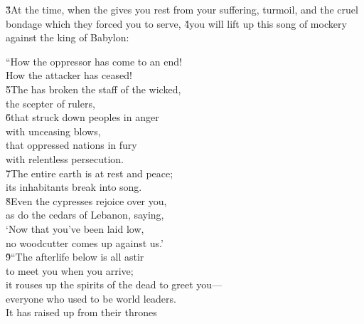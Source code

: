 \v{3}At the time, when the  gives you rest from your suffering, turmoil, and the cruel bondage which they forced you to serve, \v{4}you will lift up this song of mockery against the king of Babylon:

\begin{poetry}
\poeml ``How the oppressor has come to an end! \\
\poemll    How the attacker has ceased! \\
\poeml \v{5}The  has broken the staff of the wicked, \\
\poemll    the scepter of rulers, \\
\poeml \v{6}that struck down peoples in anger \\
\poemll    with unceasing blows, \\
\poeml that oppressed nations in fury \\
\poemll    with relentless persecution. \\
\poeml \v{7}The entire earth is at rest and peace; \\
\poemll    its inhabitants break into song. \\
\poeml \v{8}Even the cypresses rejoice over you, \\
\poemll    as do the cedars of Lebanon, saying, \\
\poeml `Now that you've been laid low, \\
\poemll    no woodcutter comes up against us.' \\
\poeml \v{9}``The afterlife below is all astir \\
\poemll    to meet you when you arrive; \\
\poeml it rouses up the spirits of the dead to greet you--- \\
\poemll    everyone who used to be world leaders. \\
\poeml It has raised up from their thrones \\

\end{poetry}
